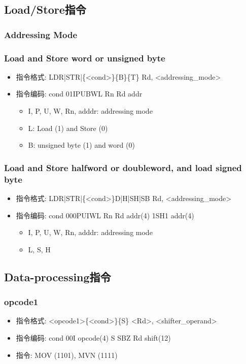 \documentclass[10pt]{book}
\begin{document}
\subsection{Load/Store指令}
\subsubsection{Addressing Mode}
\subsubsection{Load and Store word or unsigned byte}
\begin{itemize}
  \item 指令格式: LDR|STR|\{<cond>\}\{B\}\{T\} Rd, <addressing\_mode>
  \item 指令编码: cond 01IPUBWL Rn Rd addr
  \begin{itemize}
    \item I, P, U, W, Rn, adddr: addressing mode
    \item L: Load (1) and Store (0)
    \item B: unsigned byte (1) and word (0)
  \end{itemize}
\end{itemize}

\subsubsection{Load and Store halfword or doubleword, and load signed byte}
\begin{itemize}
  \item 指令格式: LDR|STR|\{<cond>\}D|H|SH|SB Rd, <addressing\_mode>
  \item 指令编码: cond 000PUIWL Rn Rd addr(4) 1SH1 addr(4)
  \begin{itemize}
    \item I, P, U, W, Rn, adddr: addressing mode
    \item L, S, H
  \end{itemize}
\end{itemize}

\subsection{Data-processing指令}
\subsubsection{opcode1}
\begin{itemize}
  \item 指令格式: <opcode1>\{<cond>\}\{S\} <Rd>, <shifter\_operand>
  \item 指令编码: cond 00I opcode(4) S SBZ Rd shift(12)
  \item 指令: MOV (1101), MVN (1111)
\end{itemize}
\end{document}
